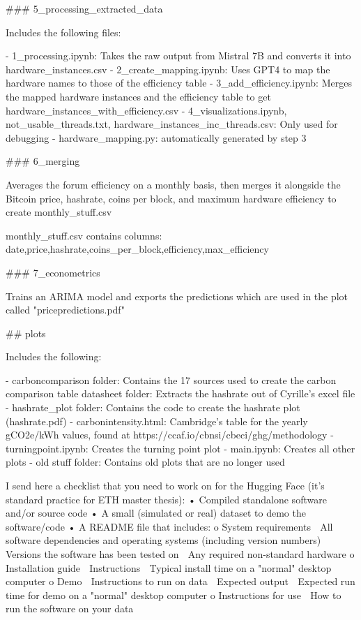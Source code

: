 ### 5_processing_extracted_data

Includes the following files:

- 1_processing.ipynb: Takes the raw output from Mistral 7B and converts it into hardware_instances.csv
- 2_create_mapping.ipynb: Uses GPT4 to map the hardware names to those of the efficiency table
- 3_add_efficiency.ipynb: Merges the mapped hardware instances and the efficiency table to get hardware_instances_with_efficiency.csv
- 4_visualizations.ipynb, not_usable_threads.txt, hardware_instances_inc_threads.csv: Only used for debugging
- hardware_mapping.py: automatically generated by step 3

### 6_merging

Averages the forum efficiency on a monthly basis, then merges it alongside the Bitcoin price, hashrate, coins per block, and maximum hardware efficiency to create monthly_stuff.csv

monthly_stuff.csv contains columns: date,price,hashrate,coins_per_block,efficiency,max_efficiency

### 7_econometrics

Trains an ARIMA model and exports the predictions which are used in the plot called "pricepredictions.pdf"


## plots

Includes the following:

- carboncomparison folder: Contains the 17 sources used to create the carbon comparison table
datasheet folder: Extracts the hashrate out of Cyrille's excel file
- hashrate_plot folder: Contains the code to create the hashrate plot (hashrate.pdf)
- carbonintensity.html: Cambridge's table for the yearly gCO2e/kWh values, found at https://ccaf.io/cbnsi/cbeci/ghg/methodology
- turningpoint.ipynb: Creates the turning point plot
- main.ipynb: Creates all other plots
- old stuff folder: Contains old plots that are no longer used




I send here a checklist that you need to work on for the Hugging Face (it's standard practice for ETH master thesis):
•	Compiled standalone software and/or source code
•	A small (simulated or real) dataset to demo the software/code
•	A README file that includes: 
o	System requirements 
	All software dependencies and operating systems (including version numbers)
	Versions the software has been tested on
	Any required non-standard hardware
o	Installation guide 
	Instructions
	Typical install time on a "normal" desktop computer
o	Demo 
	Instructions to run on data
	Expected output
	Expected run time for demo on a "normal" desktop computer
o	Instructions for use 
	How to run the software on your data


